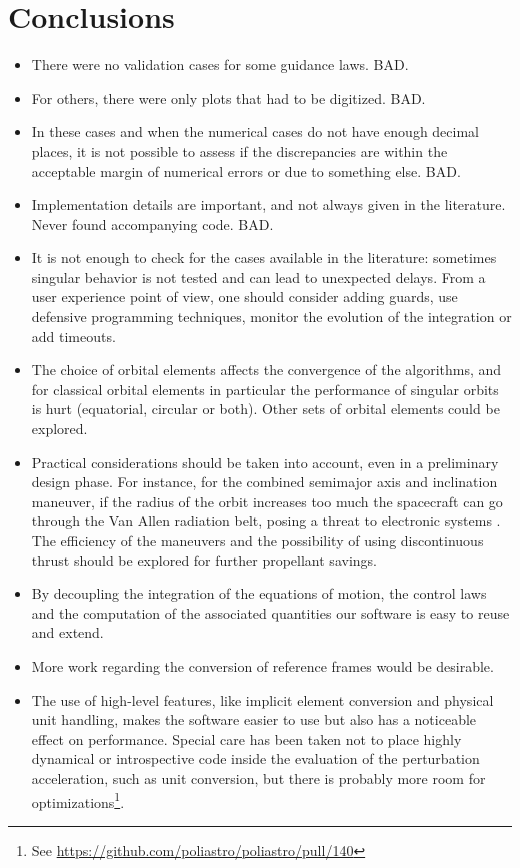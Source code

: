 \chapter{Conclusions} \label{conclusions}


\begin{itemize}
\item There were no validation cases for some guidance laws. BAD.
\item For others, there were only plots that had to be digitized. BAD.
\item In these cases and when the numerical cases do not have enough decimal places, it is not possible to assess if the discrepancies are within the acceptable margin of numerical errors or due to something else. BAD.
\item Implementation details are important, and not always given in the literature. Never found accompanying code. BAD.
\item It is not enough to check for the cases available in the literature: sometimes singular behavior is not tested and can lead to unexpected delays. From a user experience point of view, one should consider adding guards, use defensive programming techniques, monitor the evolution of the integration or add timeouts.
\item The choice of orbital elements affects the convergence of the algorithms, and for classical orbital elements in particular the performance of singular orbits is hurt (equatorial, circular or both). Other sets of orbital elements could be explored.
\item Practical considerations should be taken into account, even in a preliminary design phase. For instance, for the combined semimajor axis and inclination maneuver, if the radius of the orbit increases too much the spacecraft can go through the Van Allen radiation belt, posing a threat to electronic systems \cite{kechichian1997reformulation}. The efficiency of the maneuvers and the possibility of using discontinuous thrust should be explored for further propellant savings.
\item By decoupling the integration of the equations of motion, the control laws and the computation of the associated quantities our software is easy to reuse and extend.
\item More work regarding the conversion of reference frames would be desirable.
\item The use of high-level features, like implicit element conversion and physical unit handling, makes the software easier to use but also has a noticeable effect on performance. Special care has been taken not to place highly dynamical or introspective code inside the evaluation of the perturbation acceleration, such as unit conversion, but there is probably more room for optimizations\footnote{See \url{https://github.com/poliastro/poliastro/pull/140}}.
\end{itemize}
